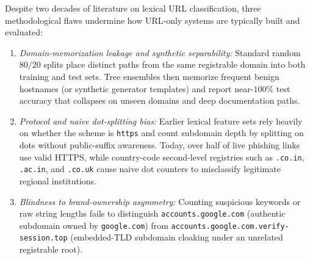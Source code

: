 \documentclass[conference]{IEEEtran}
\begin{document}
Despite two decades of literature on lexical URL classification, three methodological flaws undermine how URL-only systems are typically built and evaluated:
\begin{enumerate}
\item \textit{Domain-memorization leakage and synthetic separability:} Standard random $80/20$ splits place distinct paths from the same registrable domain into both training and test sets. Tree ensembles then memorize frequent benign hostnames (or synthetic generator templates) and report near-$100\%$ test accuracy that collapses on unseen domains and deep documentation paths.
\item \textit{Protocol and naive dot-splitting bias:} Earlier lexical feature sets rely heavily on whether the scheme is \texttt{https} and count subdomain depth by splitting on dots without public-suffix awareness. Today, over half of live phishing links use valid HTTPS, while country-code second-level registries such as \texttt{.co.in}, \texttt{.ac.in}, and \texttt{.co.uk} cause naive dot counters to misclassify legitimate regional institutions.
\item \textit{Blindness to brand-ownership asymmetry:} Counting suspicious keywords or raw string lengths fails to distinguish \texttt{accounts.google.com} (authentic subdomain owned by \texttt{google.com}) from \texttt{accounts.google.com.verify-session.top} (embedded-TLD subdomain cloaking under an unrelated registrable root).
\end{enumerate}
\end{document}
